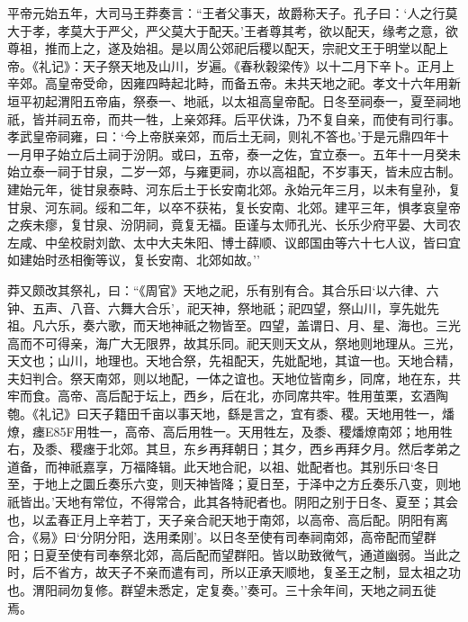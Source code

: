 \documentclass[]{article}
\begin{document}
平帝元始五年，大司马王莽奏言：``王者父事天，故爵称天子。孔子曰：`人之行莫大于孝，孝莫大于严父，严父莫大于配天。'王者尊其考，欲以配天，缘考之意，欲尊祖，推而上之，遂及始祖。是以周公郊祀后稷以配天，宗祀文王于明堂以配上帝。《礼记》：天子祭天地及山川，岁遍。《春秋穀梁传》以十二月下辛卜。正月上辛郊。高皇帝受命，因雍四畤起北畤，而备五帝。未共天地之祀。孝文十六年用新垣平初起渭阳五帝庙，祭泰一、地祇，以太祖高皇帝配。日冬至祠泰一，夏至祠地祇，皆并祠五帝，而共一牲，上亲郊拜。后平伏诛，乃不复自亲，而使有司行事。孝武皇帝祠雍，曰：`今上帝朕亲郊，而后土无祠，则礼不答也。'于是元鼎四年十一月甲子始立后土祠于汾阴。或曰，五帝，泰一之佐，宜立泰一。五年十一月癸未始立泰一祠于甘泉，二岁一郊，与雍更祠，亦以高祖配，不岁事天，皆未应古制。建始元年，徙甘泉泰畤、河东后土于长安南北郊。永始元年三月，以未有皇孙，复甘泉、河东祠。绥和二年，以卒不获祐，复长安南、北郊。建平三年，惧孝哀皇帝之疾未瘳，复甘泉、汾阴祠，竟复无福。臣谨与太师孔光、长乐少府平晏、大司农左咸、中垒校尉刘歆、太中大夫朱阳、博士薛顺、议郎国由等六十七人议，皆曰宜如建始时丞相衡等议，复长安南、北郊如故。''

莽又颇改其祭礼，曰：``《周官》天地之祀，乐有别有合。其合乐曰`以六律、六钟、五声、八音、六舞大合乐'，祀天神，祭地祇；祀四望，祭山川，享先妣先祖。凡六乐，奏六歌，而天地神祇之物皆至。四望，盖谓日、月、星、海也。三光高而不可得亲，海广大无限界，故其乐同。祀天则天文从，祭地则地理从。三光，天文也；山川，地理也。天地合祭，先祖配天，先妣配地，其谊一也。天地合精，夫妇判合。祭天南郊，则以地配，一体之谊也。天地位皆南乡，同席，地在东，共牢而食。高帝、高后配于坛上，西乡，后在北，亦同席共牢。牲用茧栗，玄酒陶匏。《礼记》曰天子籍田千亩以事天地，繇是言之，宜有黍、稷。天地用牲一，燔燎，瘗E85F用牲一，高帝、高后用牲一。天用牲左，及黍、稷燔燎南郊；地用牲右，及黍、稷瘗于北郊。其旦，东乡再拜朝日；其夕，西乡再拜夕月。然后孝弟之道备，而神祇嘉享，万福降辑。此天地合祀，以祖、妣配者也。其别乐曰`冬日至，于地上之圜丘奏乐六变，则天神皆降；夏日至，于泽中之方丘奏乐八变，则地祇皆出。'天地有常位，不得常合，此其各特祀者也。阴阳之别于日冬、夏至；其会也，以孟春正月上辛若丁，天子亲合祀天地于南郊，以高帝、高后配。阴阳有离合，《易》曰`分阴分阳，迭用柔刚'。以日冬至使有司奉祠南郊，高帝配而望群阳；日夏至使有司奉祭北郊，高后配而望群阳。皆以助致微气，通道幽弱。当此之时，后不省方，故天子不亲而遣有司，所以正承天顺地，复圣王之制，显太祖之功也。渭阳祠勿复修。群望未悉定，定复奏。''奏可。三十余年间，天地之祠五徙焉。
\end{document}
